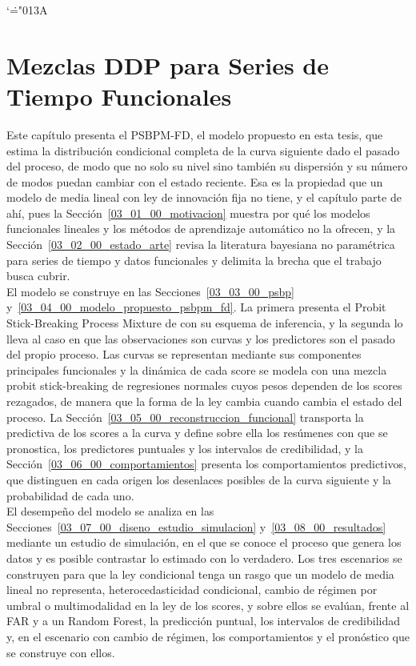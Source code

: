 \ifdefined\decimalpoint\decimalpoint\else\mathcode`\.="013A \fi


\chapter{Mezclas DDP para Series de Tiempo Funcionales}
\label{03_00_00_mezclas_ddp_series_tiempo_funcionales}

Este capítulo presenta el PSBPM-FD, el modelo propuesto en esta tesis, que estima la distribución condicional completa de la curva siguiente dado el pasado del proceso, de modo que no solo su nivel sino también su dispersión y su número de modos puedan cambiar con el estado reciente. Esa es la propiedad que un modelo de media lineal con ley de innovación fija no tiene, y el capítulo parte de ahí, pues la Sección~\ref{03_01_00_motivacion} muestra por qué los modelos funcionales lineales y los métodos de aprendizaje automático no la ofrecen, y la Sección~\ref{03_02_00_estado_arte} revisa la literatura bayesiana no paramétrica para series de tiempo y datos funcionales y delimita la brecha que el trabajo busca cubrir.\\

El modelo se construye en las Secciones~\ref{03_03_00_psbp} y~\ref{03_04_00_modelo_propuesto_psbpm_fd}. La primera presenta el Probit Stick-Breaking Process Mixture de \citet{03_02_chung2009nonparametric} con su esquema de inferencia, y la segunda lo lleva al caso en que las observaciones son curvas y los predictores son el pasado del propio proceso. Las curvas se representan mediante sus componentes principales funcionales y la dinámica de cada score se modela con una mezcla probit stick-breaking de regresiones normales cuyos pesos dependen de los scores rezagados, de manera que la forma de la ley cambia cuando cambia el estado del proceso. La Sección~\ref{03_05_00_reconstruccion_funcional} transporta la predictiva de los scores a la curva y define sobre ella los resúmenes con que se pronostica, los predictores puntuales y los intervalos de credibilidad, y la Sección~\ref{03_06_00_comportamientos} presenta los comportamientos predictivos, que distinguen en cada origen los desenlaces posibles de la curva siguiente y la probabilidad de cada uno.\\

El desempeño del modelo se analiza en las Secciones~\ref{03_07_00_diseno_estudio_simulacion} y~\ref{03_08_00_resultados} mediante un estudio de simulación, en el que se conoce el proceso que genera los datos y es posible contrastar lo estimado con lo verdadero. Los tres escenarios se construyen para que la ley condicional tenga un rasgo que un modelo de media lineal no representa, heterocedasticidad condicional, cambio de régimen por umbral o multimodalidad en la ley de los scores, y sobre ellos se evalúan, frente al FAR y a un Random Forest, la predicción puntual, los intervalos de credibilidad y, en el escenario con cambio de régimen, los comportamientos y el pronóstico que se construye con ellos. 

